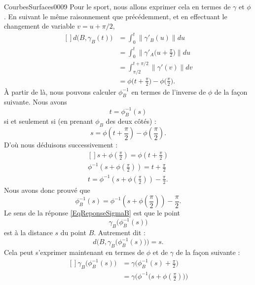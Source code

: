 \begin{corrige}{CourbesSurfaces0009}
Pour le sport, nous allons exprimer cela en termes de \(\gamma\) et \(\phi\). En suivant le même raisonnement que précédemment, et en effectuant le changement de variable \(v=u+\pi/2\),
\begin{equation}
    \begin{aligned}[]
        d\big( B,\gamma_B(t) \big)&=\int_0^t\| \gamma'_B(u) \|du\\
        &=\int_0^t\| \gamma'_A\big( u+\frac{ \pi }{2} \big) \|du\\
        &=\int_{\pi/2}^{t+\pi/2}\| \gamma'(v) \|dv\\
        &=\phi\big( t+\frac{ \pi }{2} \big)-\phi\big( \frac{ \pi }{2} \big).
    \end{aligned}
\end{equation}
À partir de là, nous pouvons calculer \(\phi_B^{-1}\) en termes de l'inverse de \(\phi\) de la façon suivante. Nous avons
\begin{equation}
    t=\phi_B^{-1}(s)
\end{equation}
si et seulement si (en prenant \(\phi_B\) des deux côtés) :
\begin{equation}
    s=\phi(t+\frac{ \pi }{2})-\phi(\frac{ \pi }{2}).
\end{equation}
D'où nous déduisons successivement :
\begin{equation}
    \begin{aligned}[]
        s+\phi(\frac{ \pi }{2})=\phi(t+\frac{ \pi }{2})\\
        \phi^{-1}\left( s+\phi(\frac{ \pi }{2}) \right)=t+\frac{ \pi }{2}\\
        t=\phi^{-1}\left( s+\phi(\frac{ \pi }{2}) \right)-\frac{ \pi }{2}.
    \end{aligned}
\end{equation}
Nous avons donc prouvé que
\begin{equation}
    \phi_B^{-1}(s)=\phi^{-1}\left( s+\phi(\frac{ \pi }{2}) \right)-\frac{ \pi }{2}.
\end{equation}
Le sens de la réponse \eqref{EqReponseSigmaB} est que le point
\begin{equation}
    \gamma_B\big( \phi_B^{-1}(s) \big)
\end{equation}
est à la distance \(s\) du point \(B\). Autrement dit :
\begin{equation}
    d\Big( B, \gamma_B\big( \phi_B^{-1}(s) \big) \Big)=s.
\end{equation}
Cela peut s'exprimer maintenant en termes de \(\phi\) et de \(\gamma\) de la façon suivante :
\begin{equation}
    \begin{aligned}[]
        \gamma_B\big( \phi_B^{-1}(s) \big)&=\gamma\big( \phi_B^{-1}(s)+\frac{ \pi }{2} \big)\\
        &=\gamma\Big( \phi^{-1}\big( s+\phi(\frac{ \pi }{2}) \big) \Big)
    \end{aligned}
\end{equation}

\end{corrige}
